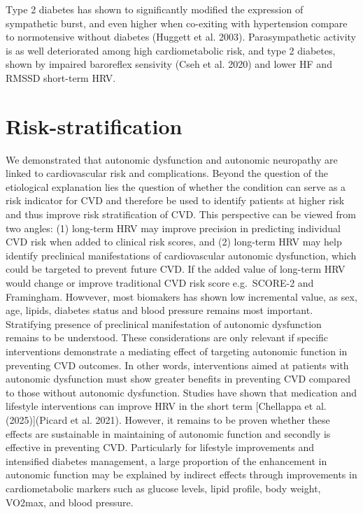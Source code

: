 \documentclass[
  a4paper,
  headsepline=true,
  open=any]{scrbook}
\begin{document}
Type 2 diabetes has shown to significantly modified the expression of
sympathetic burst, and even higher when co-exiting with hypertension
compare to normotensive without diabetes (Huggett et al. 2003).
Parasympathetic activity is as well deteriorated among high
cardiometabolic risk, and type 2 diabetes, shown by impaired baroreflex
sensivity (Cseh et al. 2020) and lower HF and RMSSD short-term HRV.

\hypertarget{risk-stratification-1}{%
\section{Risk-stratification}\label{risk-stratification-1}}

We demonstrated that autonomic dysfunction and autonomic neuropathy are
linked to cardiovascular risk and complications. Beyond the question of
the etiological explanation lies the question of whether the condition
can serve as a risk indicator for CVD and therefore be used to identify
patients at higher risk and thus improve risk stratification of CVD.
This perspective can be viewed from two angles: (1) long-term HRV may
improve precision in predicting individual CVD risk when added to
clinical risk scores, and (2) long-term HRV may help identify
preclinical manifestations of cardiovascular autonomic dysfunction,
which could be targeted to prevent future CVD. If the added value of
long-term HRV would change or improve traditional CVD risk score
e.g.~SCORE-2 and Framingham. Howvever, most biomakers has shown low
incremental value, as sex, age, lipids, diabetes status and blood
pressure remains most important. Stratifying presence of preclinical
manifestation of autonomic dysfunction remains to be understood. These
considerations are only relevant if specific interventions demonstrate a
mediating effect of targeting autonomic function in preventing CVD
outcomes. In other words, interventions aimed at patients with autonomic
dysfunction must show greater benefits in preventing CVD compared to
those without autonomic dysfunction. Studies have shown that medication
and lifestyle interventions can improve HRV in the short term
{[}Chellappa et al. (2025){]}(Picard et al. 2021). However, it remains
to be proven whether these effects are sustainable in maintaining of
autonomic function and secondly is effective in preventing CVD.
Particularly for lifestyle improvements and intensified diabetes
management, a large proportion of the enhancement in autonomic function
may be explained by indirect effects through improvements in
cardiometabolic markers such as glucose levels, lipid profile, body
weight, VO2max, and blood pressure.
\end{document}
